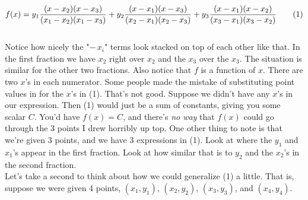 \documentclass{article}
\newcommand\numberthis{\addtocounter{equation}{1}\tag{\theequation}}
\begin{document}
\[
f(x)  = y_1 \frac{(x - x_2)(x - x_3)}{(x_1 - x_2)(x_1 - x_3)} + y_2 \frac{(x - x_1)(x - x_3)}{(x_2 - x_1)(x_2 - x_3)} + y_3 \frac{(x - x_1)(x - x_2)}{(x_3 - x_1)(x_3 - x_2)} \numberthis
\] \\

Notice how nicely the "$ - \, x_i $" terms look stacked on top of each other like that. In the first fraction we have $x_2$ right over $x_2$ and the $x_3$ over the $x_3$. The situation is similar for the other two fractions. Also notice that $f$ is a function of $x$. There are two $x$'s in each numerator. Some people made the mistake of substituting point values in for the $x$'s in (1). That's not good. Suppose we didn't have any $x$'s in our expression. Then (1) would just be a sum of constants, giving you some scalar $C$.  You'd have $f(x) = C$, and there's \textit{no way} that $f(x)$ could go through the 3 points I drew horribly up top. One other thing to note is that we're given 3 points, and we have 3 expressions in (1). Look at where the $y_1$ and $x_1$'s appear in the first fraction. Look at how similar that is to $y_2$ and the $x_2$'s in the second fraction. \\

Let's take a second to think about how we could generalize (1) a little. That is, suppose we were given 4 points, $(x_1, y_1)$, $(x_2, y_2)$, $(x_3, y_3)$, and $(x_4, y_4)$. 
\end{document}
